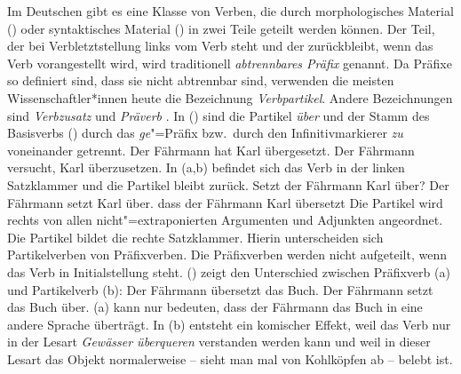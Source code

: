 Im Deutschen gibt es eine Klasse von Verben, die durch
morphologisches Material () oder syntaktisches
Material () in zwei Teile geteilt werden können. 
Der Teil, der bei Verbletztstellung links vom Verb steht und
der zurückbleibt, wenn das Verb vorangestellt wird, wird
traditionell \emph{abtrennbares Präfix} genannt. Da Präfixe
so definiert sind, dass sie nicht abtrennbar sind, verwenden
die meisten Wissenschaftler*innen heute die Bezeichnung \emph{Verbpartikel}.
Andere Bezeichnungen sind \emph{Verbzusatz} und \emph{Präverb} \citep[]{Jung67a}.
In () sind die Partikel \emph{über} und der Stamm des Basisverbs ()
durch das \emph{ge}"=Präfix bzw.\ durch den Infinitivmarkierer \emph{zu} voneinander getrennt.
\eal
\ex{}
Der Fährmann hat Karl übergesetzt.
\ex
Der Fährmann versucht, Karl überzusetzen.
\zl
In (a,b) befindet sich das Verb in der linken Satzklammer und die Partikel bleibt zurück.
\eal
\ex
Setzt der Fährmann Karl über?
\ex
Der Fährmann setzt Karl über.
\label{ex-setzt-ueber}
\ex
dass der Fährmann Karl übersetzt
\zl
Die Partikel wird rechts von allen nicht"=extraponierten Argumenten und Adjunkten
angeordnet. Die Partikel bildet die rechte Satzklammer. Hierin unterscheiden sich Partikelverben
von Präfixverben. Die Präfixverben werden nicht aufgeteilt, wenn das Verb in Initialstellung
steht. () zeigt den Unterschied zwischen Präfixverb (a) und Partikelverb (b):
\eal
\ex Der Fährmann übersetzt das Buch.
\ex Der Fährmann setzt das Buch über.
\zl
(a) kann nur bedeuten, dass der Fährmann das Buch in eine andere Sprache überträgt.
In (b) entsteht ein komischer Effekt, weil das Verb nur in der Lesart \emph{Gewässer überqueren}
verstanden werden kann und weil in dieser Lesart das Objekt normalerweise -- sieht man mal von Kohlköpfen ab --
belebt ist.

